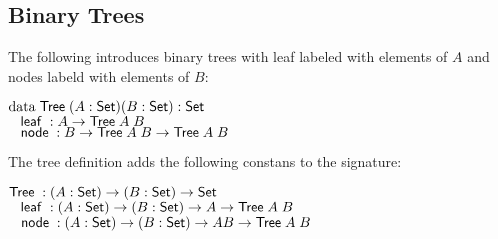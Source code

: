 \subsection{Binary Trees}
The following introduces binary trees with leaf labeled with elements of $A$ and nodes labeld with elements of $B$:
\begin{bsp}
$\data \Tree ( A : \Set ) ( B : \Set ) : \Set $ \\
$ \spc \leaf : A \ra \Tree A \; B $\\
$ \spc \node : B \ra \Tree A \; B \ra \Tree A \; B $
\end{bsp}
The tree definition adds the following constans to the signature:
\begin{bsp}
$\Tree  : ( A : \Set ) \ra ( B : \Set ) \ra \Set$ \\
$ \spc \leaf : ( A : \Set ) \ra ( B : \Set ) \ra A \ra \Tree A \; B $ \\
$ \spc \node : ( A : \Set ) \ra ( B : \Set ) \ra A B \ra \Tree A \; B $
\end{bsp}

